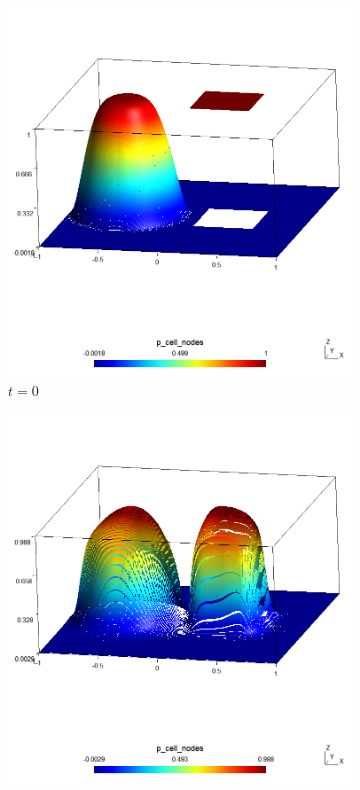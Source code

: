 \begin{figure}[h!]
    \centering
    \begin{subfigure}{.5\textwidth}	
        \centering	
        \includegraphics[width=\linewidth]{../figs/sols/kriv-sol0-3d-h14400o01}
        \caption{$t = 0$}
    \end{subfigure}%
    \begin{subfigure}{.5\textwidth}
        \centering	
        \includegraphics[width=\linewidth]{../figs/sols/kriv-sol-3d-h14400o01}

\end{subfigure}
\end{figure}
